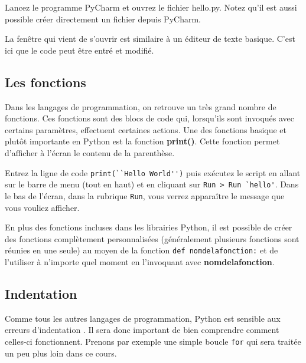 \begin{conseil}
Lancez le programme PyCharm et ouvrez le fichier hello.py. Notez qu'il est aussi possible créer directement un fichier depuis PyCharm.
 
\end {conseil}

La fenêtre qui vient de s'ouvrir est similaire à un éditeur de texte basique. C'est ici que le code peut être entré et modifié.

\subsection{Les fonctions}

Dans les langages de programmation, on retrouve un très grand nombre de fonctions. Ces fonctions sont des blocs de code qui, lorsqu'ils sont invoqués avec certains paramètres, effectuent certaines actions.
Une des fonctions basique et plutôt importante en Python est la fonction \textbf{print()}.  Cette fonction permet d'afficher à l'écran le contenu de la parenthèse.

\begin{conseil}

Entrez la ligne de code \lstinline{print(``Hello World'')} puis exécutez le script en allant sur le barre de menu (tout en haut) et en cliquant sur \lstinline{Run > Run `hello'}. Dans le bas de l'écran, dans la rubrique \lstinline{Run}, vous verrez apparaître le message que vous vouliez afficher.
\end{conseil}

En plus des fonctions incluses dans les librairies Python, il est possible de créer des fonctions complètement personnalisées (généralement plusieurs fonctions sont réunies en une seule) au moyen de la fonction \lstinline{def nomdelafonction:} et de l'utiliser à n'importe quel moment en l'invoquant avec \textbf{nomdelafonction}.

\begin{solution}

\end{solution}

\subsection{Indentation}

Comme tous les autres langages de programmation, Python est sensible aux erreurs d'indentation . Il sera donc important de bien comprendre comment celles-ci fonctionnent. Prenons par exemple une simple boucle \lstinline{for} qui sera traitée un peu plus loin dans ce cours.



